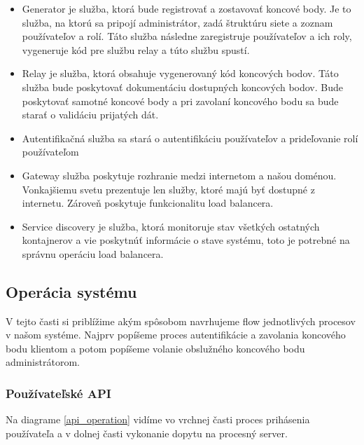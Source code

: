 \begin{itemize}
\item Generator je služba, ktorá bude registrovať a zostavovať koncové body. Je to služba, na ktorú sa pripojí administrátor, zadá štruktúru siete a zoznam používateľov a rolí. Táto služba následne zaregistruje používateľov a ich roly, vygeneruje kód pre službu relay a túto službu spustí.
\item Relay je služba, ktorá obsahuje vygenerovaný kód koncových bodov. Táto služba bude poskytovať dokumentáciu dostupných koncových bodov. Bude poskytovať samotné koncové body a pri zavolaní koncového bodu sa bude starať o validáciu prijatých dát.
\item Autentifikačná služba sa stará o autentifikáciu používateľov a prideľovanie rolí používateľom
\item Gateway služba poskytuje rozhranie medzi internetom a našou doménou. Vonkajšiemu svetu prezentuje len služby, ktoré majú byť dostupné z internetu. Zároveň poskytuje funkcionalitu load balancera.
\item Service discovery je služba, ktorá monitoruje stav všetkých ostatných kontajnerov a vie poskytnúť informácie o stave systému, toto je potrebné na správnu operáciu load balancera.
\end{itemize}


\subsection{Operácia systému}
V tejto časti si priblížime akým spôsobom navrhujeme flow jednotlivých procesov v našom systéme. Najprv popíšeme proces autentifikácie a zavolania koncového bodu klientom a potom popíšeme volanie obslužného koncového bodu administrátorom.
\subsubsection{Používateľské API}
Na diagrame \ref{api_operation} vidíme vo vrchnej časti proces prihásenia používateľa a v dolnej časti vykonanie dopytu na procesný server.


